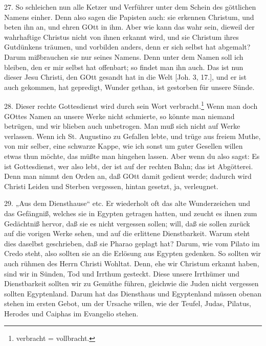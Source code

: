 27. So schleichen nun alle Ketzer und Verführer unter dem Schein des göttlichen Namens einher. Denn also sagen die Papisten auch: sie erkennen Christum, und beten ihn an, und ehren GOtt in ihm. Aber wie kann das wahr sein, dieweil der wahrhaftige Christus nicht von ihnen erkannt wird, und sie Christum ihres Gutdünkens träumen, und vorbilden anders, denn er sich selbst hat abgemalt? Darum mißbrauchen sie nur seines Namens. Denn unter dem Namen soll ich bleiben, den er mir selbst hat offenbart; so findet man ihn auch. Das ist nun dieser Jesu Christi, den GOtt gesandt hat in die Welt [Joh. 3, 17.], und er ist auch gekommen, hat gepredigt, Wunder gethan, ist gestorben für unsere Sünde.

28. Dieser rechte Gottesdienst wird durch sein Wort verbracht.\footnote{verbracht = vollbracht.} Wenn man doch GOttes Namen an unsere Werke nicht schmierte, so könnte man niemand betrügen, und wir blieben auch unbetrogen. Man muß sich nicht auf Werke verlassen. Wenn ich St. Augustino zu Gefallen lebte, und trüge aus freiem Muthe, von mir selber, eine schwarze Kappe, wie ich sonst um guter Gesellen willen etwas thun möchte, das müßte man hingehen lassen. Aber wenn du also sagst: Es ist Gottesdienst, wer also lebt, der ist auf der rechten Bahn; das ist Abgötterei. Denn man nimmt den Orden an, daß GOtt damit gedient werde; dadurch wird Christi Leiden und Sterben vergessen, hintan gesetzt, ja, verleugnet.

29. „Aus dem Diensthause“ etc. Er wiederholt oft das alte Wunderzeichen und das Gefängniß, welches sie in Egypten getragen hatten, und zeucht es ihnen zum Gedächtniß hervor, daß sie es nicht vergessen sollen; will, daß sie sollen zurück auf die vorigen Werke sehen, und auf die erlittene Dienstbarkeit. Warum steht dies daselbst geschrieben, daß sie Pharao geplagt hat? Darum, wie vom Pilato im Credo steht, also sollten sie an die Erlösung aus Egypten gedenken. So sollten wir auch rühmen des Herrn Christi Wohltat. Denn, ehe wir Christum erkannt haben, sind wir in Sünden, Tod und Irrthum gesteckt. Diese unsere Irrthümer und Dienstbarkeit sollten wir zu Gemüthe führen, gleichwie die Juden nicht vergessen sollten Egyptenland. Darum hat das Diensthaus und Egyptenland müssen obenan stehen im ersten Gebot, um der Ursache willen, wie der Teufel, Judas, Pilatus, Herodes und Caiphas im Evangelio stehen.

